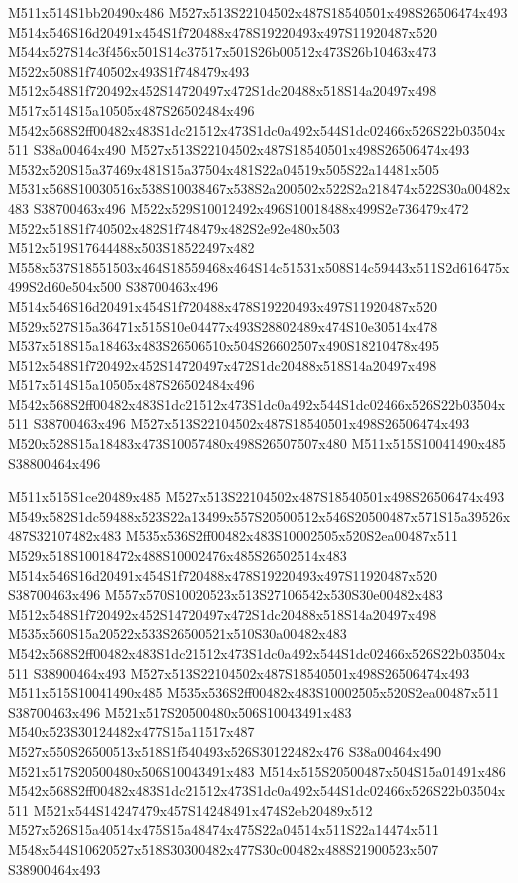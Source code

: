 \documentclass{article}
\begin{document}
\begin{multicols}{2}
M511x514S1bb20490x486 M527x513S22104502x487S18540501x498S26506474x493 M514x546S16d20491x454S1f720488x478S19220493x497S11920487x520 M544x527S14c3f456x501S14c37517x501S26b00512x473S26b10463x473 M522x508S1f740502x493S1f748479x493 M512x548S1f720492x452S14720497x472S1dc20488x518S14a20497x498 M517x514S15a10505x487S26502484x496 M542x568S2ff00482x483S1dc21512x473S1dc0a492x544S1dc02466x526S22b03504x511 S38a00464x490 M527x513S22104502x487S18540501x498S26506474x493 M532x520S15a37469x481S15a37504x481S22a04519x505S22a14481x505 M531x568S10030516x538S10038467x538S2a200502x522S2a218474x522S30a00482x483 S38700463x496 M522x529S10012492x496S10018488x499S2e736479x472 M522x518S1f740502x482S1f748479x482S2e92e480x503 M512x519S17644488x503S18522497x482 M558x537S18551503x464S18559468x464S14c51531x508S14c59443x511S2d616475x499S2d60e504x500 S38700463x496 M514x546S16d20491x454S1f720488x478S19220493x497S11920487x520 M529x527S15a36471x515S10e04477x493S28802489x474S10e30514x478 M537x518S15a18463x483S26506510x504S26602507x490S18210478x495 M512x548S1f720492x452S14720497x472S1dc20488x518S14a20497x498 M517x514S15a10505x487S26502484x496 M542x568S2ff00482x483S1dc21512x473S1dc0a492x544S1dc02466x526S22b03504x511 S38700463x496 M527x513S22104502x487S18540501x498S26506474x493 M520x528S15a18483x473S10057480x498S26507507x480 M511x515S10041490x485 S38800464x496

M511x515S1ce20489x485 M527x513S22104502x487S18540501x498S26506474x493 M549x582S1dc59488x523S22a13499x557S20500512x546S20500487x571S15a39526x487S32107482x483 M535x536S2ff00482x483S10002505x520S2ea00487x511 M529x518S10018472x488S10002476x485S26502514x483 M514x546S16d20491x454S1f720488x478S19220493x497S11920487x520 S38700463x496 M557x570S10020523x513S27106542x530S30e00482x483 M512x548S1f720492x452S14720497x472S1dc20488x518S14a20497x498 M535x560S15a20522x533S26500521x510S30a00482x483 M542x568S2ff00482x483S1dc21512x473S1dc0a492x544S1dc02466x526S22b03504x511 S38900464x493 M527x513S22104502x487S18540501x498S26506474x493 M511x515S10041490x485 M535x536S2ff00482x483S10002505x520S2ea00487x511 S38700463x496 M521x517S20500480x506S10043491x483 M540x523S30124482x477S15a11517x487 M527x550S26500513x518S1f540493x526S30122482x476 S38a00464x490 M521x517S20500480x506S10043491x483 M514x515S20500487x504S15a01491x486 M542x568S2ff00482x483S1dc21512x473S1dc0a492x544S1dc02466x526S22b03504x511 M521x544S14247479x457S14248491x474S2eb20489x512 M527x526S15a40514x475S15a48474x475S22a04514x511S22a14474x511 M548x544S10620527x518S30300482x477S30c00482x488S21900523x507 S38900464x493


\end{multicols}
\end{document}
